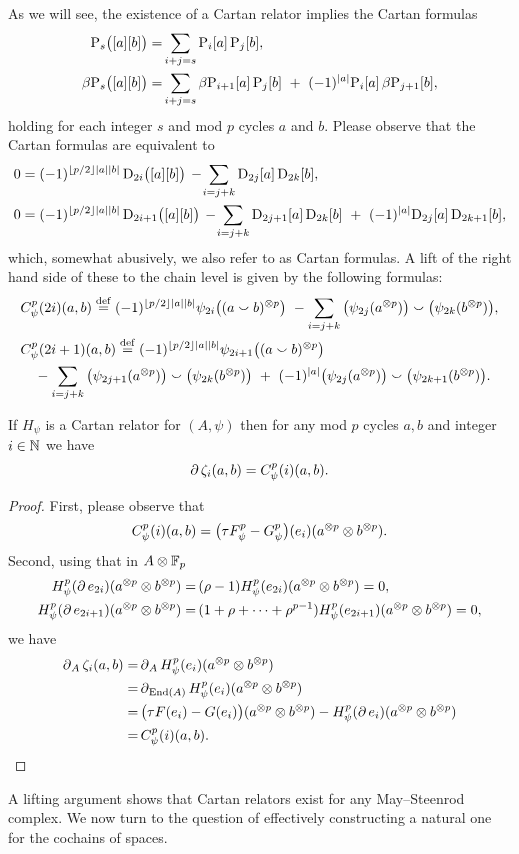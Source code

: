 As we will see, the existence of a Cartan relator implies the Cartan formulas
\begin{align*}
	\mathrm{P}_s\big([a][b]\big) =&
	\sum_{i+j=s} \mathrm{P}_i[a] \, \mathrm{P}_j[b], \\
	\beta\mathrm{P}_s\big([a][b]\big) =&
	\sum_{i+j=s} \beta\mathrm{P}_{i+1}[a] \, \mathrm{P}_j[b] \ +\ (-1)^{\lvert a\rvert} \mathrm{P}_i[a] \, \beta\mathrm{P}_{j+1}[b],
\end{align*}
holding for each integer $s$ and mod $p$ cycles $a$ and $b$.
Please observe that the Cartan formulas are equivalent to
\begin{align*}
	0 &= (-1)^{\floor{p/2}\bars{a}\bars{b}} \, \rD_{2i}\big([a][b]\big) \,-\!
	\sum_{i=j+k} \rD_{2j}[a] \, \rD_{2k}[b], \\
	0 &= (-1)^{\floor{p/2}\bars{a}\bars{b}} \, \rD_{2i+1}\big([a][b]\big) \,-\!
	\sum_{i=j+k} \rD_{2j+1}[a] \, \rD_{2k}[b] \ +\ (-1)^{\bars{a}}\rD_{2j}[a] \, \rD_{2k+1}[b],
\end{align*}
which, somewhat abusively, we also refer to as Cartan formulas.
A lift of the right hand side of these to the chain level is given by the following formulas:
\begin{align*}
	&C_\psi^p(2i)(a,b) \stackrel{\mathrm{def}}{=} (-1)^{\lfloor p/2\rfloor\lvert a\rvert\lvert b\rvert} \psi_{2i}\big((a \smallsmile b)^{\otimes p}\big) \ -
	\sum_{i=j+k}\big(\psi_{2j}(a^{\otimes p})\big) \smallsmile \big(\psi_{2k}(b^{\otimes p})\big), \\
	&C_\psi^p(2i+1)(a,b) \stackrel{\mathrm{def}}{=} (-1)^{\lfloor p/2\rfloor\lvert a\rvert\lvert b\rvert} \psi_{2i+1}\big((a \smallsmile b)^{\otimes p}\big) \\
	&\quad -\sum_{i=j+k} \big(\psi_{2j+1}(a^{\otimes p})\big) \smallsmile \big(\psi_{2k}(b^{\otimes p})\big)\ +\
	(-1)^{\lvert a\rvert}\big(\psi_{2j}(a^{\otimes p})\big) \smallsmile \big(\psi_{2k+1}(b^{\otimes p})\big).
\end{align*}

\begin{theorem*}
	If $H_\psi$ is a Cartan relator for $(A, \psi)$ then for any mod $p$ cycles $a,b$ and integer $i \in \mathbb{N}$ we have
	\[
	\operatorname{\partial} \zeta_i(a,b) = C_\psi^p(i)(a, b).
	\]
\end{theorem*}

\begin{proof}
	First, please observe that
	\[
	C^p_\psi(i)(a,b) =
	\big(\tau F_\psi^p - G_\psi^p\big)(e_i)(a^{\otimes p} \otimes b^{\otimes p}).
	\]
	Second, using that in $A \otimes {\mathbb{F}_p}$
	\begin{align*}
		H_\psi^p(\operatorname{\partial} e_{2i})(a^{\otimes p} \otimes b^{\otimes p}) =&\,
		(\rho - 1) H_\psi^p(e_{2i})(a^{\otimes p} \otimes b^{\otimes p}) = 0, \\
		H_\psi^p(\operatorname{\partial} e_{2i+1})(a^{\otimes p} \otimes b^{\otimes p}) =&\,
		(1+\rho+\dots+\rho^{p-1}) H_\psi^p(e_{2i+1})(a^{\otimes p} \otimes b^{\otimes p}) = 0,
	\end{align*}
	we have
	\begin{align*}
		\operatorname{\partial}_A \zeta_i(a,b) =&
		\operatorname{\partial}_A H_\psi^p(e_i)(a^{\otimes p} \otimes b^{\otimes p}) \\ =&
		\operatorname{\partial}_{\mathrm{End}(A)} H_\psi^p(e_i)(a^{\otimes p} \otimes b^{\otimes p}) \\ =& \,
		\big(\tau F(e_i) - G(e_i)\big)(a^{\otimes p} \otimes b^{\otimes p}) -
		H_\psi^p(\operatorname{\partial} e_i)(a^{\otimes p} \otimes b^{\otimes p}) \\ =&\,
		C^p_\psi(i)(a,b).\qedhere
	\end{align*}
\end{proof}

A lifting argument shows that Cartan relators exist for any May--Steenrod complex.
We now turn to the question of effectively constructing a natural one for the cochains of spaces.